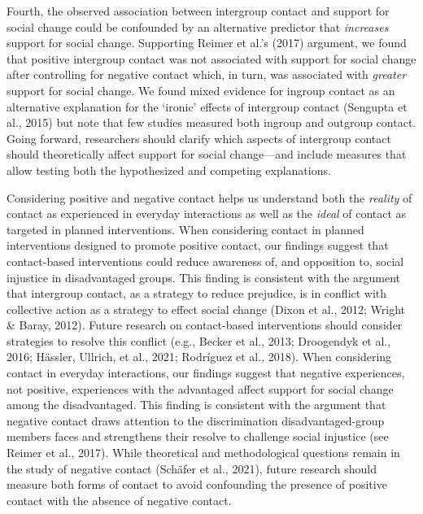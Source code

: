 \documentclass[12pt, letterpaper]{article}
\begin{document}
Fourth, the observed association between intergroup contact and support
for social change could be confounded by an alternative predictor that
\emph{increases} support for social change. Supporting Reimer et al.'s
(2017) argument, we found that positive intergroup contact was not
associated with support for social change after controlling for negative
contact which, in turn, was associated with \emph{greater} support for
social change. We found mixed evidence for ingroup contact as an
alternative explanation for the `ironic' effects of intergroup contact
(Sengupta et al., 2015) but note that few studies measured both ingroup
and outgroup contact. Going forward, researchers should clarify which
aspects of intergroup contact should theoretically affect support for
social change---and include measures that allow testing both the
hypothesized and competing explanations.

Considering positive and negative contact helps us understand both the
\emph{reality} of contact as experienced in everyday interactions as
well as the \emph{ideal} of contact as targeted in planned
interventions. When considering contact in planned interventions
designed to promote positive contact, our findings suggest that
contact-based interventions could reduce awareness of, and opposition
to, social injustice in disadvantaged groups. This finding is consistent
with the argument that intergroup contact, as a strategy to reduce
prejudice, is in conflict with collective action as a strategy to effect
social change (Dixon et al., 2012; Wright \& Baray, 2012). Future
research on contact-based interventions should consider strategies to
resolve this conflict (e.g., Becker et al., 2013; Droogendyk et al.,
2016; Hässler, Ullrich, et al., 2021; Rodríguez et al., 2018). When
considering contact in everyday interactions, our findings suggest that
negative experiences, not positive, experiences with the advantaged
affect support for social change among the disadvantaged. This finding
is consistent with the argument that negative contact draws attention to
the discrimination disadvantaged-group members faces and strengthens
their resolve to challenge social injustice (see Reimer et al., 2017).
While theoretical and methodological questions remain in the study of
negative contact (Schäfer et al., 2021), future research should measure
both forms of contact to avoid confounding the presence of positive
contact with the absence of negative contact.
\end{document}
